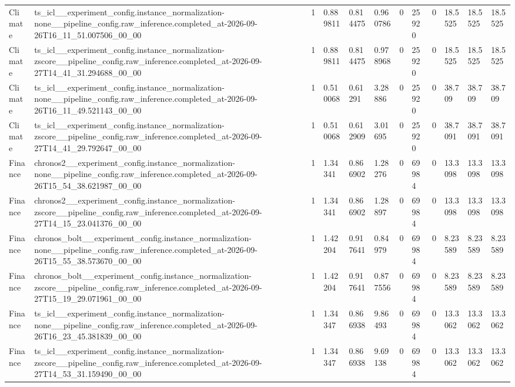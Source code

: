 \begin{tabular}{llllllllllll}
Climate & ts\_icl\_\_experiment\_config.instance\_normalization-none\_\_pipeline\_config.raw\_inference.completed\_at-2026-09-26T16\_11\_51.007506\_00\_00 & 1 & 0.889811 & 0.814475 & 0.960786 & 0 & 25920 & 0 & 18.5525 & 18.5525 & 18.5525 \\
Climate & ts\_icl\_\_experiment\_config.instance\_normalization-zscore\_\_pipeline\_config.raw\_inference.completed\_at-2026-09-27T14\_41\_31.294688\_00\_00 & 1 & 0.889811 & 0.814475 & 0.978968 & 0 & 25920 & 0 & 18.5525 & 18.5525 & 18.5525 \\
Climate & ts\_icl\_\_experiment\_config.instance\_normalization-none\_\_pipeline\_config.raw\_inference.completed\_at-2026-09-26T16\_11\_49.521143\_00\_00 & 1 & 0.510068 & 0.61291 & 3.28886 & 0 & 25920 & 0 & 38.709 & 38.709 & 38.709 \\
Climate & ts\_icl\_\_experiment\_config.instance\_normalization-zscore\_\_pipeline\_config.raw\_inference.completed\_at-2026-09-27T14\_41\_29.792647\_00\_00 & 1 & 0.510068 & 0.612909 & 3.01695 & 0 & 25920 & 0 & 38.7091 & 38.7091 & 38.7091 \\
Finance & chronos2\_\_experiment\_config.instance\_normalization-none\_\_pipeline\_config.raw\_inference.completed\_at-2026-09-26T15\_54\_38.621987\_00\_00 & 1 & 1.34341 & 0.866902 & 1.28276 & 0 & 69984 & 0 & 13.3098 & 13.3098 & 13.3098 \\
Finance & chronos2\_\_experiment\_config.instance\_normalization-zscore\_\_pipeline\_config.raw\_inference.completed\_at-2026-09-27T14\_15\_23.041376\_00\_00 & 1 & 1.34341 & 0.866902 & 1.28897 & 0 & 69984 & 0 & 13.3098 & 13.3098 & 13.3098 \\
Finance & chronos\_bolt\_\_experiment\_config.instance\_normalization-none\_\_pipeline\_config.raw\_inference.completed\_at-2026-09-26T15\_55\_38.573670\_00\_00 & 1 & 1.42204 & 0.917641 & 0.84979 & 0 & 69984 & 0 & 8.23589 & 8.23589 & 8.23589 \\
Finance & chronos\_bolt\_\_experiment\_config.instance\_normalization-zscore\_\_pipeline\_config.raw\_inference.completed\_at-2026-09-27T15\_19\_29.071961\_00\_00 & 1 & 1.42204 & 0.917641 & 0.877556 & 0 & 69984 & 0 & 8.23589 & 8.23589 & 8.23589 \\
Finance & ts\_icl\_\_experiment\_config.instance\_normalization-none\_\_pipeline\_config.raw\_inference.completed\_at-2026-09-26T16\_23\_45.381839\_00\_00 & 1 & 1.34347 & 0.866938 & 9.86493 & 0 & 69984 & 0 & 13.3062 & 13.3062 & 13.3062 \\
Finance & ts\_icl\_\_experiment\_config.instance\_normalization-zscore\_\_pipeline\_config.raw\_inference.completed\_at-2026-09-27T14\_53\_31.159490\_00\_00 & 1 & 1.34347 & 0.866938 & 9.69138 & 0 & 69984 & 0 & 13.3062 & 13.3062 & 13.3062 \\

\end{tabular}
